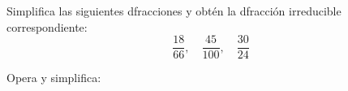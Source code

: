 \documentclass[spanish, 11pt]{exam}
\begin{document}
\begin{questions}
% 


% 




\question[3] Simplifica las siguientes dfracciones y obtén la dfracción irreducible correspondiente:  
\[
\dfrac{18}{66}, \quad \dfrac{45}{100}, \quad  \dfrac{30}{24}
\]


\question Opera y simplifica:  
\end{questions}
\end{document}
